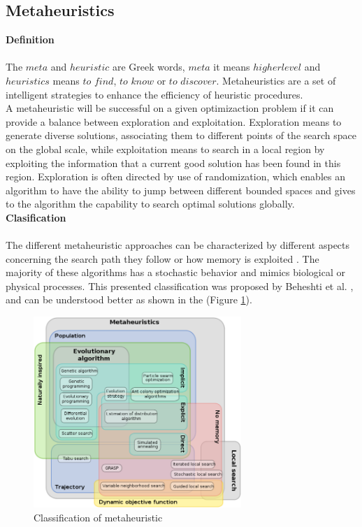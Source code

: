\subsection{Metaheuristics}
\textbf{Definition}
~\\
~\\
The $meta$ and $heuristic$ are Greek words, $meta$ it means $higher level$ and $heuristics$ means $to$ $find$, $to$ $know$ or $to$ $discover$. Metaheuristics are a set of intelligent strategies to enhance the efficiency of heuristic procedures.\\
A metaheuristic will be successful on a given optimizaction problem if it can provide a balance between exploration and exploitation. Exploration means to generate diverse solutions, associating them to different points of the search space on the global scale, while exploitation means to search in a local region by exploiting the information that a current good solution has been found in this region.
Exploration is often directed by use of randomization, which enables an algorithm to have the ability to jump between different bounded spaces and gives to the algorithm the capability to search optimal solutions globally.\\

\textbf{Clasification}
~\\
~\\
The different metaheuristic approaches can be characterized by different aspects concerning the search path they follow or how memory is exploited \cite{citeulike:1859945}. The majority of these algorithms has a stochastic behavior and mimics biological or  physical processes. This presented classification was proposed by Beheshti et al. \cite{Beheshti:2014:CCA:2563733.2564085}, and can be understood better as shown in the (Figure \ref{fig:classification-of-mh}).

\squeezeup
\begin{figure}[ht] %
	\centering
  \includegraphics[width=0.70\textwidth]{MarcoTeorico/imagenes/classification_mh.png}
	\caption{Classification of metaheuristic}\label{fig:classification-of-mh}
\end{figure}
\squeezeup


